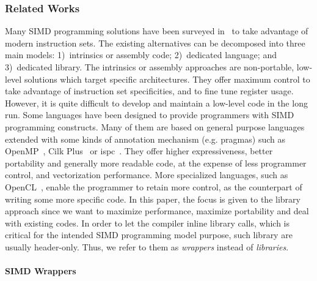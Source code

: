 \subsubsection{Related Works}

Many SIMD programming solutions have been surveyed in~\cite{Pohl2016} to take
advantage of modern instruction sets. The existing alternatives can be
decomposed into three main models: 1)~intrinsics or assembly code; 2)~dedicated
language; and 3)~dedicated library. The intrinsics or assembly approaches are
non-portable, low-level solutions which target specific architectures. They
offer maximum control to take advantage of instruction set specificities, and to
fine tune register usage. However, it is quite difficult to develop and maintain
a low-level code in the long run. Some languages have been designed to provide
programmers with SIMD programming constructs. Many of them are based on general
purpose languages extended with some kinds of annotation mechanism (e.g.
pragmas) such as OpenMP~\cite{OpenMP2013}, Cilk Plus~\cite{Robison2013} or
ispc~\cite{Pharr2012}. They offer higher expressiveness, better portability and
generally more readable code, at the expense of less programmer control, and
vectorization performance. More specialized languages, such as
OpenCL~\cite{Howes2015}, enable the programmer to retain more control, as the
counterpart of writing some more specific code.
In this paper, the focus is given to the library approach since we want to
maximize performance, maximize portability and deal with existing \Cxx codes. In
order to let the compiler inline library calls, which is critical for the
intended SIMD programming model purpose, such library are usually header-only.
Thus, we refer to them as \textit{wrappers} instead of \textit{libraries}.

\paragraph{\Cxx SIMD Wrappers}

